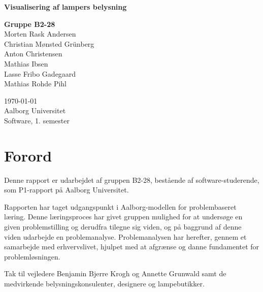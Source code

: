 \begin{titlepage}
  \vspace{0.2cm}
  \begin{center}
    \Huge{\textbf{Visualisering af lampers belysning}}
  \end{center}
  \vspace{0.2cm}
  \begin{center}
    \Large{\textbf{Gruppe B2-28}}\\
	Morten Rask Andersen\\
	Christian Mønsted Grünberg\\
	Anton Christensen\\
	Mathias Ibsen\\
	Lasse Fribo Gadegaard\\
	Mathias Rohde Pihl
  \end{center}
  \vfill
  \begin{center}
 	\today\\
    Aalborg Universitet\\
    Software, 1. semester
  \end{center}
\end{titlepage}



\section{Forord}
Denne rapport er udarbejdet af gruppen B2-28, bestående af software-studerende, som P1-rapport på Aalborg Universitet.

Rapporten har taget udgangspunkt i Aalborg-modellen for problembaseret læring. Denne læringsproces har givet gruppen mulighed for at undersøge en given problemstilling og derudfra tilegne sig viden, og på baggrund af denne viden udarbejde en problemanalyse. Problemanalysen har herefter, gennem et samarbejde med erhvervslivet, hjulpet med at afgrænse og danne fundamentet for problemløsningen.

Tak til vejledere Benjamin Bjerre Krogh og Annette Grunwald samt de medvirkende belysningskonsulenter, designere og lampebutikker.









\clearpage